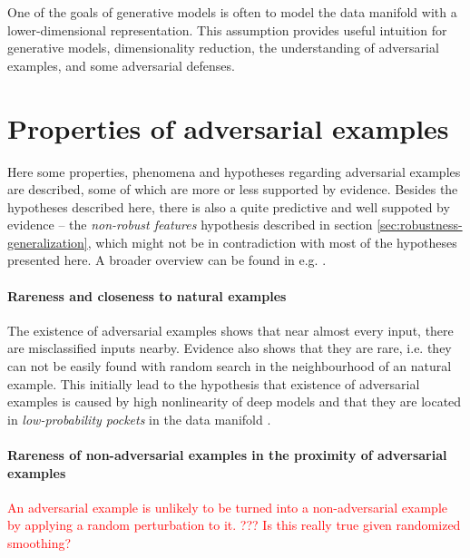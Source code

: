 \documentclass[oneside]{book}
\begin{document}
One of the goals of generative models is often to model the data manifold with a lower-dimensional representation. This assumption provides useful intuition for generative models, dimensionality reduction, the understanding of adversarial examples, and some adversarial defenses.


\section{Properties of adversarial examples}

Here some properties, phenomena and hypotheses regarding adversarial examples are described, some of which are more or less supported by evidence. Besides the hypotheses described here, there is also a quite predictive and well suppoted by evidence -- the \textit{non-robust features} hypothesis \citep{Ilyas:2019:AENBTF,Tsipras:2018:RMBOA} described in section \ref{sec:robustness-generalization}, which might not be in contradiction with most of the hypotheses presented here. A broader overview can be found in e.g. \citet{Serban:2018:AECCP}.

\paragraph{Rareness and closeness to natural examples} The existence of adversarial examples shows that near almost every input, there are misclassified inputs nearby. Evidence also shows that they are rare, i.e. they can not be easily found with random search in the neighbourhood of an natural example. This initially lead to the hypothesis that existence of adversarial examples is caused by high nonlinearity of deep models and that they are located in \textit{low-probability pockets} in the data manifold \citep{Szegedy:2013:IPNN}.

\paragraph{Rareness of non-adversarial examples in the proximity of adversarial examples} \textcolor{red}{An adversarial example is unlikely to be turned into a non-adversarial example by applying a random perturbation to it. ??? Is this really true given randomized smoothing?}  %
\end{document}
